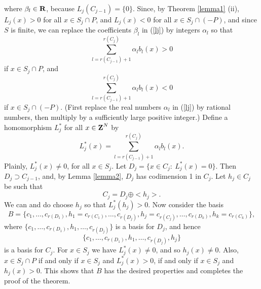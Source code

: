 where $\beta_l\in\R$, because $L_j (C_{j-1})=\{0\}$.  Since,
by Theorem \ref{lemma1} (ii),
$L_j(x)>0$ for all $x\in S_j\cap P$,
and $L_j(x)<0$ for all $x\in S_j\cap (-P)$, 
and since $S$ is finite,
we can replace the coefficients $\beta_l$ in (\ref{lj})
by integers $\alpha_l$ so that
$$\sum_{l=r(C_{j-1})+1}^{r(C_j)}
\alpha_l b_l(x)>0$$
if $x\in S_j\cap P$, and 
$$\sum_{l=r(C_{j-1})+1}^{r(C_j)}
\alpha_l b_l(x)<0$$
if $x\in S_j\cap (-P)$.
(First replace the real numbers
$\alpha_l$ in (\ref{lj}) by rational numbers,
then multiply by a sufficiently large positive integer.) 
Define a homomorphism $L_j^*$ for all $x\in \Z^N$ by
$$L_j^*(x)=\sum_{l=r(C_{j-1})+1}^{r(C_j)}
\alpha_l b_l(x).$$
Plainly, $L^*_j(x)\neq 0$, for all $x\in S_j$.
Let 
$D_j=\{x\in C_j:\ L_j^*(x)=0\}$.
Then $D_j\supset C_{j-1}$, and,
by Lemma \ref{lemma2}, $D_j$ has codimension 1
in $C_j$.  Let $h_j\in C_j$ be such that
$$C_j=D_j\oplus <h_j>.$$
We can and do choose $h_j$ so that
$L_j^*(h_j)>0$.  Now consider the basis
$$B=\{c_1,\ldots,c_{r(D_1)},h_1=c_{r(C_1)},
\ldots,  
c_{r(D_j)},h_j=c_{r(C_j)},
\ldots,  
c_{r(D_k)},h_k=c_{r(C_k)}
\},$$
where
$\{
c_1,\ldots,c_{r(D_1)},h_1,
\ldots,  
c_{r(D_j)}
\}$
is a basis for $D_j$, and hence 
$$\{
c_1,\ldots,c_{r(D_1)},h_1,
\ldots,  
c_{r(D_j)}, h_j
\}$$
is a basis for $C_j$.
For $x\in S_j$ we have
$L^*_j(x)\neq 0$, and so $h_j(x)\neq 0$.  Also,
  $x\in S_j\cap P$
if and only if $x\in S_j$ and $L^*_j(x)>0$,
if and only if 
$x\in S_j$ and $h_j(x)>0$.
This shows that $B$ has the desired properties and
completes the proof of the theorem.
